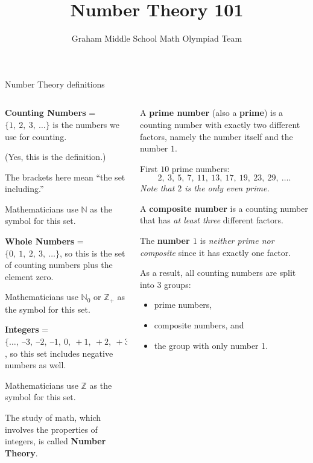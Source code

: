 \documentclass[9pt,aspectratio=169]{beamer}
\title{Number Theory 101}
\subtitle[Graham Middle School]{Graham Middle School Math Olympiad Team}
\begin{document}
\maketitle

\begin{frame}{Number Theory definitions}
  \begin{columns}[T]
    \begin{column}{0.5\textwidth}
      \textbf{Counting Numbers} = $\{1,\ 2,\ 3,\ \ldots\}$ is the numbers we use for counting. 
      
      (Yes, this is the definition.)

      The brackets here mean “the set including.” 
      
      Mathematicians use $\mathbb{N}$ as the symbol for this set.\medskip

      \textbf{Whole Numbers} = $\{0,\ 1,\ 2,\ 3,\ \ldots\}$, so this is the set of counting numbers plus the element zero. 
      
      Mathematicians use $\mathbb{N}_0$ or $\mathbb{Z}_+$ as the symbol for this set.\medskip

      \textbf{Integers} = $\{\ldots,\ –3,\ –2,\ –1,\ 0,\ +1,\ +2,\ +3,\ \ldots\}$, so this set includes negative numbers as well. 
      
      Mathematicians use $\mathbb{Z}$ as the symbol for this set.\medskip

      The study of math, which involves the properties of integers, is called \textbf{Number Theory}.
    \end{column}
    \begin{column}{0.5\textwidth}
      \begin{definition}
        A \textbf{prime number} (also a \textbf{prime}) is a counting number with exactly two different factors, namely the number itself and the number $1$. 
        
        First $10$ prime numbers: 
        \[ 2,\ 3,\ 5,\ 7,\ 11,\ 13,\ 17,\ 19,\ 23,\ 29,\ \ldots. \]
        \emph{Note that $2$ is the only even prime.}
      \end{definition}

      \begin{example}
        A \textbf{composite number} is a counting number that has \emph{at least three} different factors.\smallskip

        The \textbf{number $1$} is \emph{neither prime nor composite} since it has exactly one factor.
      \end{example}
      As a result, all counting numbers are split into $3$ groups:
      \begin{itemize}
        \item prime numbers, 
        \item composite numbers, and 
        \item the group with only number 1.
      \end{itemize}
    \end{column}
  \end{columns}
\end{frame}
\end{document}

